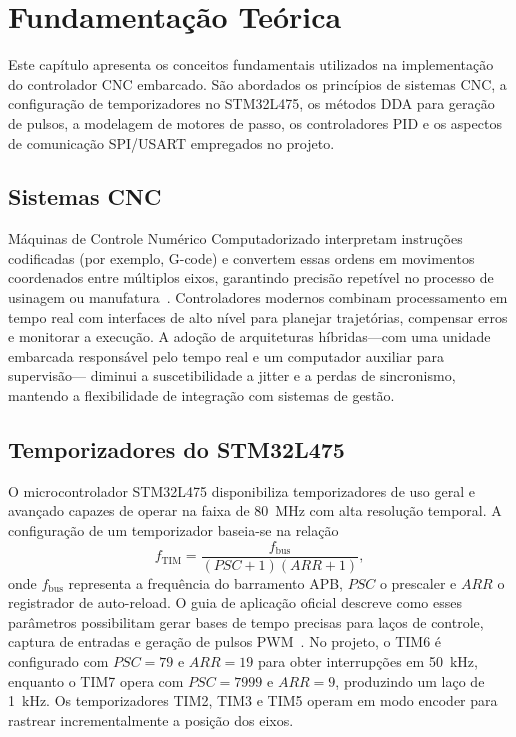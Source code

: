 \chapter{Fundamentação Teórica}\label{cap:fundamentacao}

Este capítulo apresenta os conceitos fundamentais utilizados na
implementação do controlador CNC embarcado. São abordados os princípios
de sistemas CNC, a configuração de temporizadores no STM32L475, os
métodos DDA para geração de pulsos, a modelagem de motores de passo,
os controladores PID e os aspectos de comunicação SPI/USART empregados no
projeto.

\section{Sistemas CNC}

Máquinas de Controle Numérico Computadorizado interpretam instruções
codificadas (por exemplo, G-code) e convertem essas ordens em movimentos
coordenados entre múltiplos eixos, garantindo precisão repetível no
processo de usinagem ou manufatura~\cite{groover2015}. Controladores
modernos combinam processamento em tempo real com interfaces de alto
nível para planejar trajetórias, compensar erros e monitorar a execução.
A adoção de arquiteturas híbridas---com uma unidade embarcada
responsável pelo tempo real e um computador auxiliar para supervisão---
diminui a suscetibilidade a jitter e a perdas de sincronismo, mantendo a
flexibilidade de integração com sistemas de gestão.

\section{Temporizadores do STM32L475}

O microcontrolador STM32L475 disponibiliza temporizadores de uso geral e
avançado capazes de operar na faixa de \SI{80}{\mega\hertz} com alta
resolução temporal. A configuração de um temporizador baseia-se na
relação
\begin{equation}
    f_{\text{TIM}} = \frac{f_{\text{bus}}}{(PSC+1)(ARR+1)},
\end{equation}
onde $f_{\text{bus}}$ representa a frequência do barramento APB, $PSC$ o
prescaler e $ARR$ o registrador de auto-reload. O guia de aplicação
oficial descreve como esses parâmetros possibilitam gerar bases de tempo
precisas para laços de controle, captura de entradas e geração de pulsos
PWM~\cite{st_an4013}. No projeto, o TIM6 é configurado com
$PSC = 79$ e $ARR = 19$ para obter interrupções em \SI{50}{\kilo\hertz},
enquanto o TIM7 opera com $PSC = 7999$ e $ARR = 9$, produzindo um laço
de \SI{1}{\kilo\hertz}. Os temporizadores TIM2, TIM3 e TIM5 operam em
modo encoder para rastrear incrementalmente a posição dos eixos.

